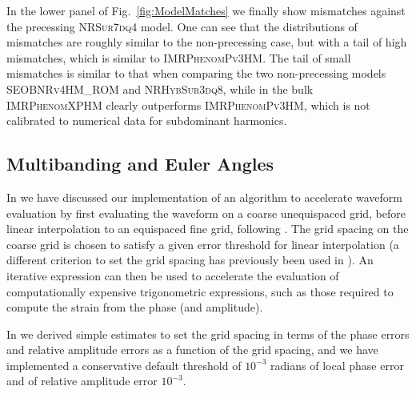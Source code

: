 \documentclass[%
aps,
prd,
amssymb,
amsmath,
amsfonts,
eqsecnum,
showpacs,
nofootinbib,
floatfix,
twocolumn,
twoside,
a4paper,
superscriptaddress
]{revtex4-1}
\newcommand{\phPvthreehm}{\textsc{IMRPhenomPv3HM}\xspace}
\newcommand{\phXPHM}{\textsc{IMRPhenomXPHM}\xspace}
\newcommand{\NRHybSur}{\textsc{NRHybSur3dq8}\xspace}
\newcommand{\NRSur}{\textsc{NRSur7dq4}\xspace}
\newcommand{\seobnrvforhmrom}{\textsc{SEOBNRv4HM\_ROM}\xspace}
\begin{document}
In the lower panel of Fig.~\ref{fig:ModelMatches} we finally show mismatches against the precessing \NRSur model. One can see that the distributions of mismatches are roughly similar to the non-precessing case, but with a tail of high mismatches, which is similar to \phPvthreehm. The tail of small mismatches is similar to that when comparing the two non-precessing models \seobnrvforhmrom and \NRHybSur, while in the bulk \phXPHM clearly outperforms \phPvthreehm,
which is not calibrated to numerical data for subdominant harmonics.



\subsection{Multibanding and Euler Angles}
\label{subsec:multibanding}
In \cite{Garcia-Quiros:2020qlt} we have discussed our implementation of an algorithm to accelerate waveform evaluation by first evaluating the waveform on a coarse unequispaced grid,
before linear interpolation to an equispaced fine grid, following \cite{Vinciguerra:2017ngf}. The grid spacing on the coarse grid is chosen to satisfy a given error threshold for linear interpolation (a different criterion to set the grid spacing has previously been used in \cite{Vinciguerra:2017ngf}). An iterative expression can then be used to accelerate the evaluation of computationally expensive trigonometric expressions, such as those required to compute the strain from the phase (and amplitude).

In \cite{Garcia-Quiros:2020qlt} we derived simple estimates to set the grid spacing in terms of the phase errors and relative amplitude errors as a function of the grid spacing, and we have implemented a conservative default threshold of $10^{-3}$ radians of local phase error and of relative amplitude error  $10^{-3}$.
\end{document}
